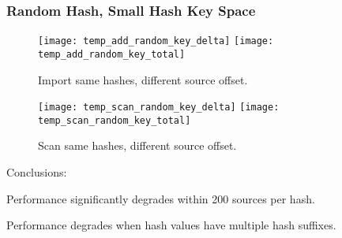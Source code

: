 \documentclass[12pt,twoside]{article}
\begin{document}
\subsubsection* {Random Hash, Small Hash Key Space}

\begin{figure}[H]
  \center
  \texttt{[image: temp\_add\_random\_key\_delta]}
  \texttt{[image: temp\_add\_random\_key\_total]}
  \caption*{Import same hashes, different source offset.}
\end{figure}

\begin{figure}[H]
  \center
  \texttt{[image: temp\_scan\_random\_key\_delta]}
  \texttt{[image: temp\_scan\_random\_key\_total]}
  \caption*{Scan same hashes, different source offset.}
\end{figure}

Conclusions:
\begin{compactitem}
\item Performance significantly degrades within 200 sources per hash.
\item Performance degrades when hash values have multiple hash suffixes.
\end{compactitem}
\end{document}
